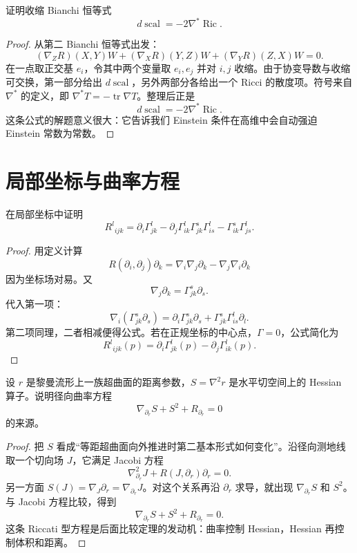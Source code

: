 \documentclass[11pt,a4paper,openany]{ctexbook}
\numberwithin{equation}{chapter}
\begin{document}
\begin{problem}
证明收缩 Bianchi 恒等式
\[
d\operatorname{scal}=-2\nabla^*\operatorname{Ric}.
\]
\end{problem}
\begin{proof}
从第二 Bianchi 恒等式出发：
\[
(\nabla_ZR)(X,Y)W+(\nabla_XR)(Y,Z)W+(\nabla_YR)(Z,X)W=0.
\]
在一点取正交基 \(e_i\)，令其中两个变量取 \(e_i,e_j\) 并对 \(i,j\) 收缩。由于协变导数与收缩可交换，第一部分给出 \(d\operatorname{scal}\)，另外两部分各给出一个 Ricci 的散度项。符号来自 \(\nabla^*\) 的定义，即 \(\nabla^*T=-\operatorname{tr}\nabla T\)。整理后正是
\[
d\operatorname{scal}=-2\nabla^*\operatorname{Ric}.
\]
这条公式的解题意义很大：它告诉我们 Einstein 条件在高维中会自动强迫 Einstein 常数为常数。
\end{proof}

\section{局部坐标与曲率方程}

\begin{problem}
在局部坐标中证明
\[
R^l{}_{ijk}=\partial_i\Gamma^l_{jk}-\partial_j\Gamma^l_{ik}
\Gamma^s_{jk}\Gamma^l_{is}-\Gamma^s_{ik}\Gamma^l_{js}.
\]
\end{problem}
\begin{proof}
用定义计算
\[
R(\partial_i,\partial_j)\partial_k
=\nabla_i\nabla_j\partial_k-\nabla_j\nabla_i\partial_k
\]
因为坐标场对易。又
\[
\nabla_j\partial_k=\Gamma^s_{jk}\partial_s.
\]
代入第一项：
\[
\nabla_i(\Gamma^s_{jk}\partial_s)
=\partial_i\Gamma^s_{jk}\partial_s+\Gamma^s_{jk}\Gamma^l_{is}\partial_l.
\]
第二项同理，二者相减便得公式。若在正规坐标的中心点，\(\Gamma=0\)，公式简化为
\[
R^l{}_{ijk}(p)=\partial_i\Gamma^l_{jk}(p)-\partial_j\Gamma^l_{ik}(p).
\]
\end{proof}

\begin{problem}
设 \(r\) 是黎曼流形上一族超曲面的距离参数，\(S=\nabla^2r\) 是水平切空间上的 Hessian 算子。说明径向曲率方程
\[
\nabla_{\partial_r}S+S^2+R_{\partial_r}=0
\]
的来源。
\end{problem}
\begin{proof}
把 \(S\) 看成“等距超曲面向外推进时第二基本形式如何变化”。沿径向测地线取一个切向场 \(J\)，它满足 Jacobi 方程
\[
\nabla_{\partial_r}^2J+R(J,\partial_r)\partial_r=0.
\]
另一方面 \(S(J)=\nabla_J\partial_r=\nabla_{\partial_r}J\)。对这个关系再沿 \(\partial_r\) 求导，就出现 \(\nabla_{\partial_r}S\) 和 \(S^2\)。与 Jacobi 方程比较，得到
\[
\nabla_{\partial_r}S+S^2+R_{\partial_r}=0.
\]
这条 Riccati 型方程是后面比较定理的发动机：曲率控制 Hessian，Hessian 再控制体积和距离。
\end{proof}
\end{document}
